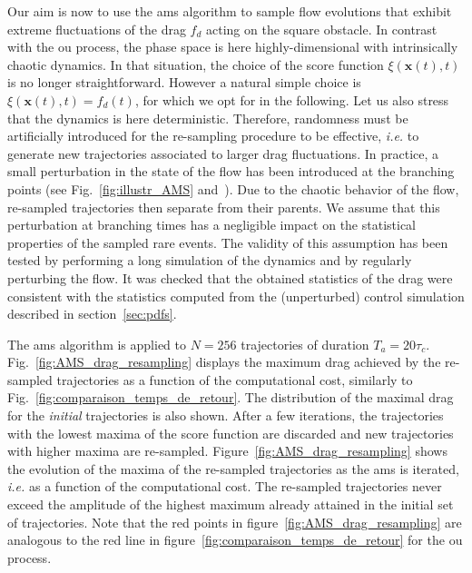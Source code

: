 \documentclass{jfm}
\begin{document}
%
%
Our aim is now to use the \ac{ams} algorithm to sample flow evolutions that exhibit extreme fluctuations of the drag $f_d$ acting on the square obstacle.
In contrast with the \acl{ou} process, the phase space is here highly-dimensional with intrinsically chaotic dynamics.
In that situation, the choice of the score function $\xi (\mathbf{x}(t),t)$ is no longer straightforward.
However a natural simple choice is $\xi (\mathbf{x}(t),t) = f_d(t)$, for which we opt for in the following.
%
{Let us also stress that the dynamics is here deterministic.
Therefore, randomness must be artificially introduced for the re-sampling procedure to be effective, \textit{i.e.} to generate new trajectories associated to larger drag fluctuations.
In practice, a small perturbation in the state of the flow has been introduced at the branching points (see Fig.~\ref{fig:illustr_AMS} and~\citep{wouters2016rare}).
%
Due to the chaotic behavior of the flow, re-sampled trajectories then separate from their parents.
We assume that this perturbation at branching times has a negligible impact on the statistical properties of the sampled rare events.
The validity of this assumption has been tested by performing a long simulation of the dynamics and by regularly perturbing the flow.
It was checked that the obtained statistics of the drag were consistent with the statistics computed from the (unperturbed) control simulation described in section~\ref{sec:pdfs}.}


%
The \ac{ams} algorithm is applied to $N=256$ trajectories of duration $T_a = 20\tau_c$.
%
Fig.~\ref{fig:AMS_drag_resampling} displays the maximum drag achieved by the re-sampled trajectories as a function of the computational cost, similarly to Fig.~\ref{fig:comparaison_temps_de_retour}.
%
%
The distribution of the maximal drag for the \textit{initial} trajectories is also shown.
After a few iterations, the trajectories with the lowest maxima of the score function are discarded and new trajectories with higher maxima are re-sampled.
Figure~\ref{fig:AMS_drag_resampling} shows the evolution of the maxima of the re-sampled trajectories as the \ac{ams} is iterated, \textit{i.e.} as a function of the computational cost.
The re-sampled trajectories never exceed the amplitude of the highest maximum already attained in the initial set of trajectories.
Note that the red points in figure~\ref{fig:AMS_drag_resampling} are analogous to the red line in figure~\ref{fig:comparaison_temps_de_retour} for the \ac{ou} process.
\end{document}
